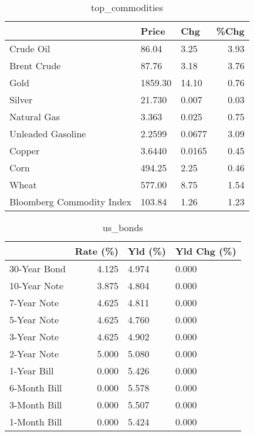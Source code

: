 \documentclass{article}%
\begin{document}
\begin{table}[htbp]%
\caption{top\_commodities}%
\centering%
\begin{adjustbox}{width=1\textwidth}%
\begin{tabular}{lllr}
\toprule
                          &   Price &    Chg &  \%Chg \\
\midrule
               Crude Oil  &   86.04 &   3.25 &  3.93 \\
             Brent Crude  &   87.76 &   3.18 &  3.76 \\
                    Gold  & 1859.30 &  14.10 &  0.76 \\
                  Silver  &  21.730 &  0.007 &  0.03 \\
             Natural Gas  &   3.363 &  0.025 &  0.75 \\
       Unleaded Gasoline  &  2.2599 & 0.0677 &  3.09 \\
                  Copper  &  3.6440 & 0.0165 &  0.45 \\
                    Corn  &  494.25 &   2.25 &  0.46 \\
                   Wheat  &  577.00 &   8.75 &  1.54 \\
Bloomberg Commodity Index &  103.84 &   1.26 &  1.23 \\
\bottomrule
\end{tabular}
%
\end{adjustbox}%
\end{table}

%


\begin{table}[htbp]%
\caption{us\_bonds}%
\centering%
\begin{adjustbox}{width=1\textwidth}%
\begin{tabular}{lrll}
\toprule
             &  Rate (\%) & Yld (\%) & Yld Chg (\%) \\
\midrule
30-Year Bond &     4.125 &   4.974 &       0.000 \\
10-Year Note &     3.875 &   4.804 &       0.000 \\
 7-Year Note &     4.625 &   4.811 &       0.000 \\
 5-Year Note &     4.625 &   4.760 &       0.000 \\
 3-Year Note &     4.625 &   4.902 &       0.000 \\
 2-Year Note &     5.000 &   5.080 &       0.000 \\
 1-Year Bill &     0.000 &   5.426 &       0.000 \\
6-Month Bill &     0.000 &   5.578 &       0.000 \\
3-Month Bill &     0.000 &   5.507 &       0.000 \\
1-Month Bill &     0.000 &   5.424 &       0.000 \\
\bottomrule
\end{tabular}
%
\end{adjustbox}%
\end{table}
\end{document}
